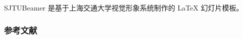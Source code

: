 \documentclass{ctexbeamer}
\begin{document}
\begin{frame}
  SJTUBeamer 是基于上海交通大学视觉形象系统\cite{viman}制作的 \LaTeX{} 幻灯片模板。
\end{frame}
\begin{frame}[allowframebreaks]
  \frametitle{参考文献}
  \renewcommand{\bibfont}{\tiny}
  
\end{frame}
\end{document}
